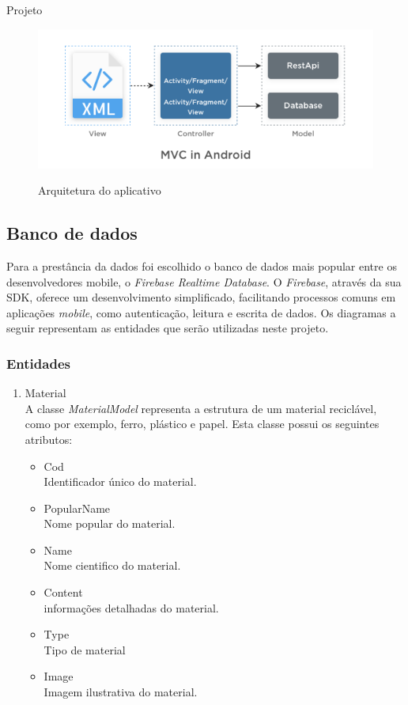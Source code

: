 \documentclass[
	12pt,				%
	openright,			%
	twoside,			%
	a4paper,			%
	english,			%
	french,				%
	spanish,			%
	brazil				%
	]{abntex2}
\begin{document}
\begin{chapter}{Projeto}
\begin{figure}[h]
\centering
   \caption{Arquitetura do aplicativo}
   \includegraphics[scale=0.40]{media/MVC.png}
     \label{fig:arquitetura_mvc}
\end{figure}


\subsection{Banco de dados}
Para a prestância da dados foi escolhido o banco de dados mais popular entre os desenvolvedores mobile, o \textit{Firebase Realtime Database}. O \textit{Firebase}, através da sua SDK, oferece um desenvolvimento simplificado, facilitando processos comuns em aplicações \textit{mobile}, como autenticação, leitura e escrita de dados.
 Os diagramas a seguir representam as entidades que serão utilizadas neste projeto.


\subsubsection{Entidades}
\begin{enumerate}
 \item{Material} \\ A classe \textit{MaterialModel} representa a estrutura de um material reciclável, como por exemplo, ferro, plástico e papel. Esta classe possui os seguintes atributos:
 
 \begin{itemize}
  \item{Cod}\\ Identificador único do material.
   \item{PopularName}\\ Nome popular do material.
     \item{Name}\\ Nome cientifico do material.
       \item{Content}\\ informações detalhadas do material.
         \item{Type}\\ Tipo de material
           \item{Image}\\ Imagem ilustrativa do material.
\end{itemize}
  

\end{enumerate}
\end{chapter}
\end{document}
